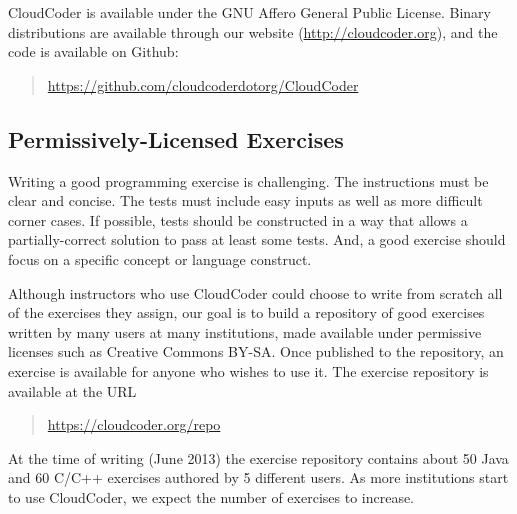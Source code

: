 \documentclass{sig-alternate}
\begin{document}
CloudCoder is available under the GNU Affero General Public License\cite{AGPL}.
Binary distributions are available through our website (\url{http://cloudcoder.org}),
and the code is available on Github:
\begin{quote}
\url{https://github.com/cloudcoderdotorg/CloudCoder}
\end{quote}


\subsection{Permissively-Licensed Exercises}

Writing a good programming exercise is challenging.
The instructions must be clear and concise.  The tests must
include easy inputs as well as more difficult corner cases.
If possible, tests should be constructed in a way that
allows a partially-correct solution to pass at least some
tests.  And, a good exercise should focus on a specific concept
or language construct.


Although instructors who use CloudCoder
could choose to write from scratch all of the exercises they assign,
our goal is to build a repository of good exercises
written by many users at many institutions, made available under
permissive licenses such as Creative Commons BY-SA\cite{CC-BY-SA}.
Once published to the repository, an exercise is available
for anyone who wishes to use it.
The exercise repository is available at the URL
\begin{quote}
\url{https://cloudcoder.org/repo}
\end{quote}
%
At the time of writing (June 2013) the exercise repository contains about 50 Java and
60 C/C++ exercises authored by 5 different users.  As more institutions
start to use CloudCoder, we expect the number of exercises to increase.
\end{document}
